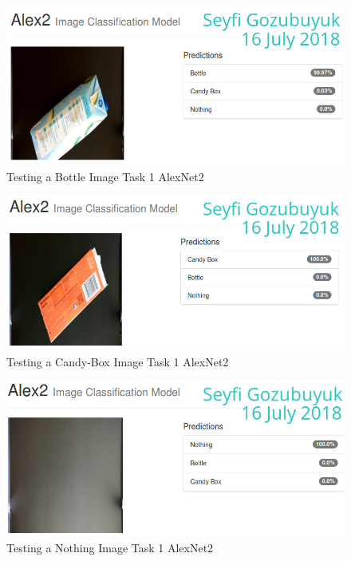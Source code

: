 \documentclass[10pt,journal,compsoc]{IEEEtran}
\begin{document}
\begin{figure}[thpb]
      \centering
      \includegraphics[width=\linewidth]{figures/t1a2t1.png}
      \caption{Testing a Bottle Image Task 1 AlexNet2}
      \label{fig:t1a2t1}
\end{figure}


\begin{figure}[thpb]
      \centering
      \includegraphics[width=\linewidth]{figures/t1a2t2.png}
      \caption{Testing a Candy-Box Image Task 1 AlexNet2}
      \label{fig:t1a2t2}
\end{figure}


\begin{figure}[thpb]
      \centering
      \includegraphics[width=\linewidth]{figures/t1a2t3.png}
      \caption{Testing a Nothing Image Task 1 AlexNet2}
      \label{fig:t1a2t3}
\end{figure}
\end{document}
